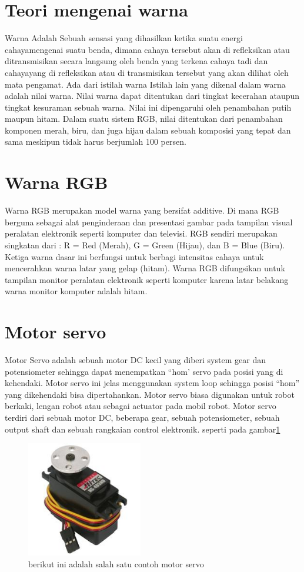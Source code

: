 \section{Teori mengenai warna}
Warna Adalah Sebuah sensasi yang dihasilkan ketika suatu energi cahayamengenai suatu benda, dimana cahaya tersebut akan di refleksikan atau ditransmisikan secara langsung oleh benda yang terkena cahaya tadi dan cahayayang di refleksikan atau di transmisikan tersebut yang akan dilihat oleh mata pengamat. Ada dari istilah warna Istilah lain yang dikenal dalam warna adalah nilai warna. Nilai warna dapat ditentukan dari tingkat kecerahan ataupun tingkat kesuraman sebuah warna. Nilai ini dipengaruhi oleh penambahan putih maupun hitam. Dalam suatu sistem RGB, nilai ditentukan dari penambahan komponen merah, biru, dan juga hijau dalam sebuah komposisi yang tepat dan sama meskipun tidak harus berjumlah 100 persen.

\section{Warna RGB}
Warna RGB merupakan  model warna yang bersifat additive. Di mana RGB berguna sebagai  alat penginderaan dan presentasi gambar pada tampilan visual peralatan elektronik seperti komputer dan televisi. RGB sendiri merupakan singkatan dari : R = Red (Merah), G = Green (Hijau), dan B = Blue (Biru). Ketiga warna dasar ini berfungsi untuk berbagi intensitas cahaya untuk mencerahkan warna latar yang gelap (hitam).  Warna RGB difungsikan untuk tampilan monitor peralatan elektronik seperti komputer karena latar belakang warna monitor komputer adalah hitam.

\section{Motor servo}
Motor Servo adalah sebuah motor DC kecil yang diberi system gear dan potensiometer sehingga dapat menempatkan “hom’ servo pada posisi yang di kehendaki. Motor servo ini jelas menggunakan system loop sehingga posisi “hom” yang dikehendaki bisa dipertahankan. Motor servo biasa digunakan untuk robot berkaki, lengan robot atau sebagai actuator pada mobil robot. Motor servo terdiri dari sebuah motor DC, beberapa gear, sebuah potensiometer, sebuah output shaft dan sebuah rangkaian control elektronik. seperti pada gambar\ref{fig_handrobotic}
\begin{figure}[!htbp]
  \centering
  \includegraphics[width=0.45\textwidth]{figures/handrobotic/motorservo.jpg}
  \caption{berikut ini adalah salah satu contoh motor servo}\label{fig_handrobotic}
\end{figure}

